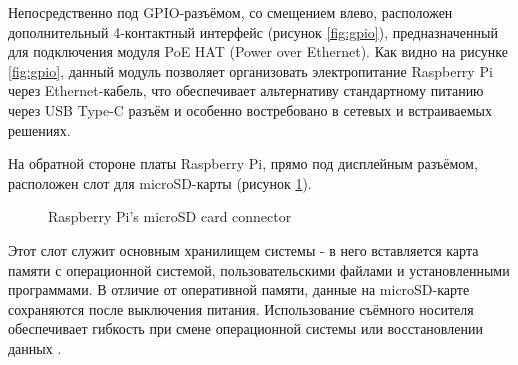 Непосредственно под GPIO-разъёмом, со смещением влево, расположен дополнительный 4-контактный интерфейс (рисунок \ref{fig:gpio}), предназначенный для подключения модуля PoE HAT (Power over Ethernet). Как видно на рисунке \ref{fig:gpio}, данный модуль позволяет организовать электропитание Raspberry Pi через Ethernet-кабель, что обеспечивает альтернативу стандартному питанию через USB Type-C разъём и особенно востребовано в сетевых и встраиваемых решениях.

На обратной стороне платы Raspberry Pi, прямо под дисплейным разъёмом, расположен слот для microSD-карты (рисунок \ref{fig:microSd}).

\begin{figure}[H]
	\centering
	\caption{Raspberry Pi’s microSD card connector}
	\label{fig:microSd}
\end{figure}

Этот слот служит основным хранилищем системы - в него вставляется карта памяти с операционной системой, пользовательскими файлами и установленными программами. В отличие от оперативной памяти, данные на microSD-карте сохраняются после выключения питания. Использование съёмного носителя обеспечивает гибкость при смене операционной системы или восстановлении данных \cite{RaspberryPi}.
\newpage
